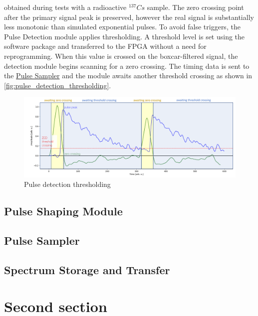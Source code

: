\documentclass[12pt]{article}
\begin{document}
		obtained during tests with a radioactive $^{137}Cs$ sample. 
		The zero crossing point after the primary signal peak is preserved, 
		however the real signal is substantially less monotonic than simulated exponential pulses.
		To avoid false triggers, the Pulse Detection module applies thresholding.
		A threshold level is set using the software package 
		and transferred to the FPGA without a need for reprogramming. 
		When this value is crossed on the boxcar-filtered signal, 
		the detection module begins scanning for a zero crossing. 
		The timing data is sent to the \hyperref[ssec:pulse_sampler]{Pulse Sampler}
		and the module awaits another threshold crossing as shown in \autoref{fig:pulse_detection_thresholding}.
		\begin{figure}[!hb]
			\centering
			\includegraphics[width=\textwidth]{img/pulse_detection_internal.png}
			\caption{Pulse detection thresholding}\label{fig:pulse_detection_thresholding}
		\end{figure}
	\subsection{Pulse Shaping Module}\label{ssec:pulse_shaping_module}

	\subsection{Pulse Sampler}\label{ssec:pulse_sampler}
	\subsection{Spectrum Storage and Transfer}\label{ssec:spectrum_storage_and_transfer}
\section{Second section}

\fullboxbegin
\lipsum[1]
\fullboxend

\lipsum[1]
\end{document}
